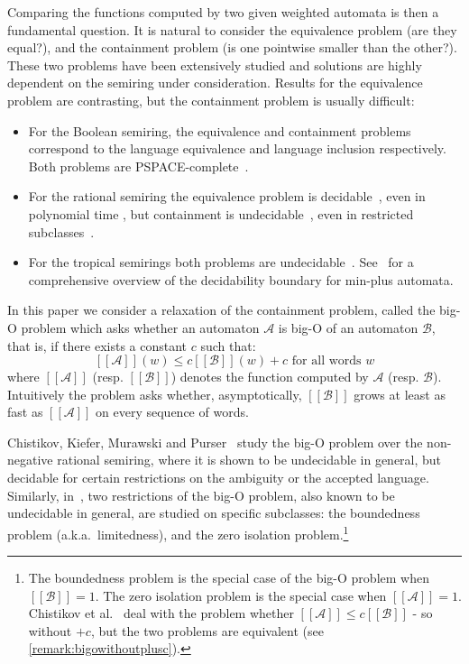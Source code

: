 \documentclass[10pt,a4paper]{amsart}
\theoremstyle{definition}
\numberwithin{equation}{section}
\theoremstyle{remark}
\newcommand{\autA}{\mathcal{A}}
\newcommand{\autB}{\mathcal{B}}
\newcommand{\brfunc}[1]{[\![#1]\!]}
\newcommand{\funcA}{\brfunc{\autA}}
\newcommand{\funcB}{\brfunc{\autB}}
\theoremstyle{remark}
\begin{document}
Comparing the functions computed by two given weighted automata is then a fundamental question. It is natural to consider the equivalence problem (are they equal?), and the containment problem (is one pointwise smaller than the other?). These two problems have been extensively studied and solutions are highly dependent on the semiring under consideration. Results for the equivalence problem are contrasting, but the containment problem is usually difficult:
\begin{itemize}
    \item For the Boolean semiring, the equivalence and containment problems correspond to the language equivalence and language inclusion respectively. Both problems are PSPACE-complete~\cite{StockmeyerM73}.
    \item For the rational semiring the equivalence problem is decidable~\cite{Schutzenberger61b}, even in polynomial time \cite{kiefer13}, but containment is undecidable~\cite{paz2014introduction}, even in restricted subclasses~\cite{DaviaudJLMP021}.
    \item For the tropical semirings both problems are undecidable~\cite{Krob94}. See~\cite{AlmagorBK22,AlmagorBK11} for a comprehensive overview of the decidability boundary for min-plus automata.
\end{itemize}

In this paper we consider a relaxation of the containment problem, called the big-O problem which asks whether an automaton $\autA$ is big-O of an automaton $\autB$, that is, if there exists a constant $c$ such that:
\[
\funcA(w) \le c\funcB(w) + c\text{ for all words } w
\]
where $\funcA$ (resp. $\funcB$) denotes the function computed by $\autA$ (resp. $\autB$).
Intuitively the problem asks whether, asymptotically, $\funcB$ grows at least as fast as $\funcA$ on every sequence of words.

Chistikov, Kiefer, Murawski and Purser~\cite{ChistikovKMP20,ChistikovKMP22} study the big-O problem over the non-negative rational semiring, where it is shown to be undecidable in general, but decidable for certain restrictions on the ambiguity or the accepted language. Similarly, in~\cite{CzerwinskiLMPW22}, two restrictions of the big-O problem, also known to be undecidable in general, are studied on specific subclasses: the boundedness problem (a.k.a.~limitedness), and the zero isolation problem.\footnote{The boundedness problem is the special case of the big-O problem when $\funcB = 1$. The zero isolation problem is the special case when $\funcA = 1$. Chistikov et al.~\cite{ChistikovKMP22} deal with the problem whether $\funcA \le c\funcB$ - so without $+c$, but the two problems are equivalent (see \cref{remark:bigowithoutplusc}).}
\end{document}
